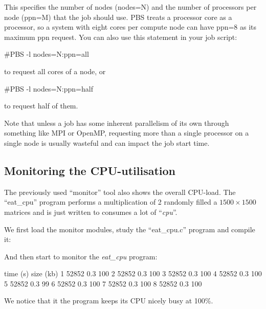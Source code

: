 This specifies the number of nodes (nodes=N) and the number of processors per
node (ppn=M) that the job should use. PBS treats a processor core as a
processor, so a system with eight cores per compute node can have ppn=8 as its
maximum ppn request.
You can also use this statement in your job script:

\begin{prompt}
#PBS -l nodes=N:ppn=all
\end{prompt}

to request all cores of a node, or

\begin{prompt}
#PBS -l nodes=N:ppn=half
\end{prompt}

to request half of them.


Note that unless a job has some inherent parallelism of
its own through something like MPI or OpenMP, requesting more than a single
processor on a single node is usually wasteful and can impact the job start
time.

\subsection{Monitoring the CPU-utilisation}

\ifgent
\else
  The previously used ``monitor'' tool also shows the overall CPU-load. The
  ``eat\_cpu'' program performs a multiplication of 2 randomly filled a $1500 \times 1500$
  matrices and is just written to consumes a lot of ``\emph{cpu}''.
  
  We first load the monitor modules, study the ``eat\_cpu.c'' program and compile it:
  \begin{prompt}
  \end{prompt}
  
  And then start to monitor the \emph{eat\_cpu} program:
  \begin{prompt}
  time  (s) size (kb) %
  1  52852  0.3 100
  2  52852  0.3 100
  3  52852  0.3 100
  4  52852  0.3 100
  5  52852  0.3  99
  6  52852  0.3 100
  7  52852  0.3 100
  8  52852  0.3 100
  \end{prompt}
  
  We notice that it the program keeps its CPU nicely busy at 100\%.
  
